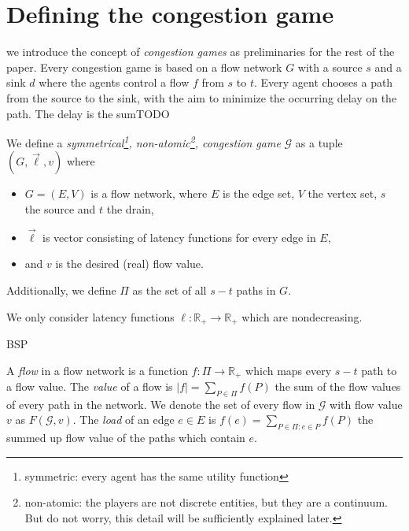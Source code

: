 \section{Defining the congestion game}
\newcommand{\tupel}[1]{\left(#1\right)}
 we introduce the concept of \emph{congestion games} as preliminaries for the rest of the paper.
Every congestion game is based on a flow network $G$ with a source $s$ and a sink $d$ where the agents control a flow $f$ from $s$ to $t$.
Every agent chooses a path from the source to the sink, with the aim to minimize the occurring delay on the path.
The delay is the sumTODO

\begin{definition}
	We define a \emph{symmetrical\footnote{symmetric: every agent has the same utility function}, non-atomic\footnote{non-atomic: the players are not discrete entities, but they are a continuum. But do not worry, this detail will be sufficiently explained later.}, congestion game} $\mathcal G$ as a tuple $(G, \vec{\ell}, v)$ where
	\begin{itemize}
		\item $G = (E, V)$ is a flow network, where $E$ is the edge set, $V$ the vertex set, $s$ the source and $t$ the drain,
		\item $\vec{\ell}$ is vector consisting of latency functions for every edge in $E$,
		\item and $v$ is the desired (real) flow value.
	\end{itemize}
	Additionally, we define $\Pi$ as the set of all $s-t$ paths in $G$.
\end{definition}

\begin{remark}
	We only consider latency functions $\ell \colon \mathbb R_+ \to \mathbb R_+$ which are nondecreasing.
\end{remark} 

BSP
\begin{definition}[Flow]
	A \emph{flow} in a flow network is a function $f \colon \Pi \to \mathbb R_+$ which maps every $s-t$ path to a flow value.
	The \emph{value} of a flow is $|f| = \sum_{P \in \Pi} f(P)$ the sum of the flow values of every path in the network.
	We denote the set of every flow in $\mathcal G$ with flow value $v$ as $F(\mathcal G, v)$.
	The \emph{load} of an edge $e \in E$ is $f(e) = \sum_{P \in \Pi \colon e \in P} f(P)$ the summed up flow value of the paths which contain $e$.
\end{definition}


